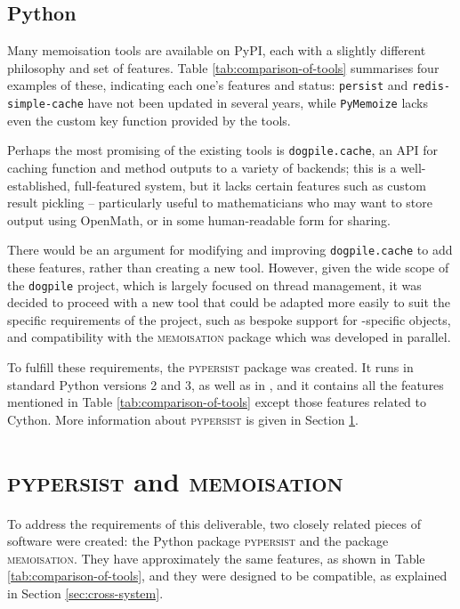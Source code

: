 \documentclass{deliverablereport}
\newcommand{\pypersist}{\textsc{pypersist}}
\newcommand{\Memoisation}{\textsc{memoisation}}
\begin{document}
\subsection{Python}
Many memoisation tools are available on PyPI, each with a slightly different
philosophy and set of features.  Table \ref{tab:comparison-of-tools} summarises
four examples of these, indicating each one's features and status:
\texttt{persist} and \texttt{redis-simple-cache} have not been updated in
several years, while \texttt{PyMemoize} lacks even the custom key function
provided by the \Sage tools.

Perhaps the most promising of the existing tools is \texttt{dogpile.cache}, an
API for caching function and method outputs to a variety of backends; this is a
well-established, full-featured system, but it lacks certain features such as
custom result pickling -- particularly useful to mathematicians who may want to
store output using OpenMath, or in some human-readable form for sharing.

There would be an argument for modifying and improving \texttt{dogpile.cache} to
add these features, rather than creating a new tool.  However, given the wide
scope of the \texttt{dogpile} project, which is largely focused on thread
management, it was decided to proceed with a new tool that could be adapted more
easily to suit the specific requirements of the project, such as bespoke support
for \Sage-specific objects, and compatibility with the \GAP \Memoisation{} package
which was developed in parallel.

To fulfill these requirements, the \pypersist{} package was created.  It runs in
standard Python versions 2 and 3, as well as in \Sage, and it contains all the features mentioned in Table
\ref{tab:comparison-of-tools} except those features related to Cython.  More
information about \pypersist{} is given in Section \ref{sec:pypersist}.

\section{\pypersist{} and \Memoisation{}}
\label{sec:pypersist}

To address the requirements of this deliverable, two closely related pieces of
software were created: the Python package \pypersist{} and the \GAP package
\Memoisation{}.  They have approximately the same features, as shown in Table
\ref{tab:comparison-of-tools}, and they were designed to be compatible, as
explained in Section \ref{sec:cross-system}.
\end{document}
